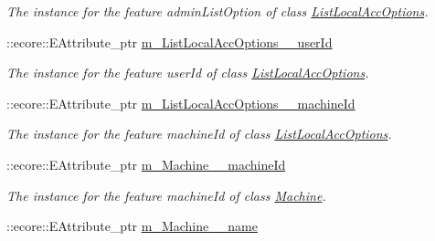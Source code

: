 \begin{DoxyCompactItemize}
\begin{DoxyCompactList}\small\item\em The instance for the feature adminListOption of class \hyperlink{classUMS__Data_1_1ListLocalAccOptions}{ListLocalAccOptions}. \item\end{DoxyCompactList}\item 
\hypertarget{classUMS__Data_1_1UMS__DataPackage_a6ec01f8f97de420e99d6d2da73c5718d}{
::ecore::EAttribute\_\-ptr \hyperlink{classUMS__Data_1_1UMS__DataPackage_a6ec01f8f97de420e99d6d2da73c5718d}{m\_\-ListLocalAccOptions\_\-\_\-userId}}
\label{classUMS__Data_1_1UMS__DataPackage_a6ec01f8f97de420e99d6d2da73c5718d}

\begin{DoxyCompactList}\small\item\em The instance for the feature userId of class \hyperlink{classUMS__Data_1_1ListLocalAccOptions}{ListLocalAccOptions}. \item\end{DoxyCompactList}\item 
\hypertarget{classUMS__Data_1_1UMS__DataPackage_a4bc30bbf8e74a01132fd0ad753a5e06a}{
::ecore::EAttribute\_\-ptr \hyperlink{classUMS__Data_1_1UMS__DataPackage_a4bc30bbf8e74a01132fd0ad753a5e06a}{m\_\-ListLocalAccOptions\_\-\_\-machineId}}
\label{classUMS__Data_1_1UMS__DataPackage_a4bc30bbf8e74a01132fd0ad753a5e06a}

\begin{DoxyCompactList}\small\item\em The instance for the feature machineId of class \hyperlink{classUMS__Data_1_1ListLocalAccOptions}{ListLocalAccOptions}. \item\end{DoxyCompactList}\item 
\hypertarget{classUMS__Data_1_1UMS__DataPackage_af81079a435b87dd1057b5350379c5853}{
::ecore::EAttribute\_\-ptr \hyperlink{classUMS__Data_1_1UMS__DataPackage_af81079a435b87dd1057b5350379c5853}{m\_\-Machine\_\-\_\-machineId}}
\label{classUMS__Data_1_1UMS__DataPackage_af81079a435b87dd1057b5350379c5853}

\begin{DoxyCompactList}\small\item\em The instance for the feature machineId of class \hyperlink{classUMS__Data_1_1Machine}{Machine}. \item\end{DoxyCompactList}\item 
\hypertarget{classUMS__Data_1_1UMS__DataPackage_a83a1049c55b40cae1bd302ee8f02fd23}{
::ecore::EAttribute\_\-ptr \hyperlink{classUMS__Data_1_1UMS__DataPackage_a83a1049c55b40cae1bd302ee8f02fd23}{m\_\-Machine\_\-\_\-name}}
\label{classUMS__Data_1_1UMS__DataPackage_a83a1049c55b40cae1bd302ee8f02fd23}


\end{DoxyCompactItemize}
